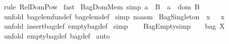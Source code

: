 \begin{isabellebody}
\ {\isacharparenleft}rule\ Rel{\isacharunderscore}Dom{\isacharunderscore}Pow{\isacharparenright}\isanewline
{}\isamarkupfalse%
\ fast\isanewline
{}\isamarkupfalse%
%
\endisatagproof
{\isafoldproof}%
%
\isadelimproof
\isanewline
%
\endisadelimproof
\isanewline
{}\isamarkupfalse%
\ BagDomMem\ {\isacharbrackleft}simp{\isacharbrackright}{\isacharcolon}\ {\isachardoublequoteopen}{\isacharparenleft}a\ {\isacharbrackleft}{\isacharcolon}\ B{\isacharparenright}\ {\isacharequal}\ {\isacharparenleft}a\ {\isacharcolon}\ {\isacharparenleft}dom\ B{\isacharparenright}{\isacharparenright}{\isachardoublequoteclose}\isanewline
%
\isadelimproof
%
\endisadelimproof
%
\isatagproof
{}\isamarkupfalse%
\ {\isacharparenleft}unfold\ bagelem{\isacharunderscore}fun{\isacharunderscore}def\ bagelem{\isacharunderscore}def{\isacharparenright}\isanewline
{}\isamarkupfalse%
\ {\isacharparenleft}simp\ {\isacharparenleft}no{\isacharunderscore}asm{\isacharparenright}{\isacharparenright}\isanewline
{}\isamarkupfalse%
%
\endisatagproof
{\isafoldproof}%
%
\isadelimproof
\isanewline
%
\endisadelimproof
\isanewline
{}\isamarkupfalse%
\ BagSingleton{\isacharcolon}\ {\isachardoublequoteopen}{\isacharpercent}{\isacharbrackleft}\ x\ {\isacharpercent}{\isacharbrackright}\ {\isacharequal}\ {\isacharbraceleft}{\isacharparenleft}x{\isacharcomma}{}{\isacharparenright}{\isacharbraceright}{\isachardoublequoteclose}\isanewline
%
\isadelimproof
%
\endisadelimproof
%
\isatagproof
{}\isamarkupfalse%
\ {\isacharparenleft}unfold\ insertbag{\isacharunderscore}def\ emptybag{\isacharunderscore}def{\isacharparenright}\isanewline
{}\isamarkupfalse%
\ simp\isanewline
{}\isamarkupfalse%
%
\endisatagproof
{\isafoldproof}%
%
\isadelimproof
\isanewline
%
\endisadelimproof
\ \ \isanewline
{}\isamarkupfalse%
\ BagEmpty{\isacharbrackleft}simp{\isacharbrackright}{\isacharcolon}\ \ {\isachardoublequoteopen}{\isacharpercent}{\isacharbrackleft}{\isacharpercent}{\isacharbrackright}\ {\isacharcolon}\ {\isacharparenleft}bag\ X{\isacharparenright}{\isachardoublequoteclose}\isanewline
%
\isadelimproof
%
\endisadelimproof
%
\isatagproof
{}\isamarkupfalse%
\ {\isacharparenleft}unfold\ emptybag{\isacharunderscore}def\ bag{\isacharunderscore}def{\isacharparenright}\isanewline
{}\isamarkupfalse%
\ auto\isanewline
{}\isamarkupfalse%
%
\endisatagproof
{\isafoldproof}%
%
\isadelimproof
\isanewline
%
\endisadelimproof

\end{isabellebody}
